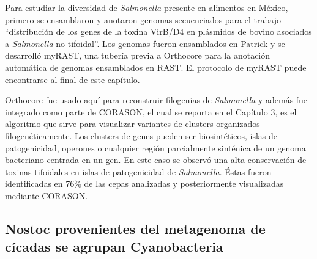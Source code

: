 \documentclass[12pt,twoside]{reedthesis}
\begin{document}
  Para estudiar la diversidad de \emph{Salmonella} presente en alimentos
  en México, primero se ensamblaron y anotaron genomas secuenciados para
  el trabajo ``distribución de los genes de la toxina VirB/D4 en plásmidos
  de bovino asociados a \emph{Salmonella} no tifoidal''. Los genomas
  fueron ensamblados en Patrick y se desarrolló myRAST, una tubería previa
  a Orthocore para la anotación automática de genomas ensamblados en RAST.
  El protocolo de myRAST puede encontrarse al final de este capítulo.
  
  Orthocore fue usado aquí para reconstruir filogenias de
  \emph{Salmonella} y además fue integrado como parte de CORASON, el cual
  se reporta en el Capítulo 3, es el algoritmo que sirve para visualizar
  variantes de clusters organizados filogenéticamente. Los clusters de
  genes pueden ser biosintéticos, islas de patogenicidad, operones o
  cualquier región parcialmente sinténica de un genoma bacteriano centrada
  en un gen. En este caso se observó una alta conservación de toxinas
  tifoidales en islas de patogenicidad de \emph{Salmonella}. Éstas fueron
  identificadas en 76\% de las cepas analizadas y posteriormente
  visualizadas mediante CORASON.
  
  \subsection{Nostoc provenientes del metagenoma de cícadas se agrupan
  Cyanobacteria}\label{nostoc-provenientes-del-metagenoma-de-cicadas-se-agrupan-cyanobacteria}
  
\end{document}
